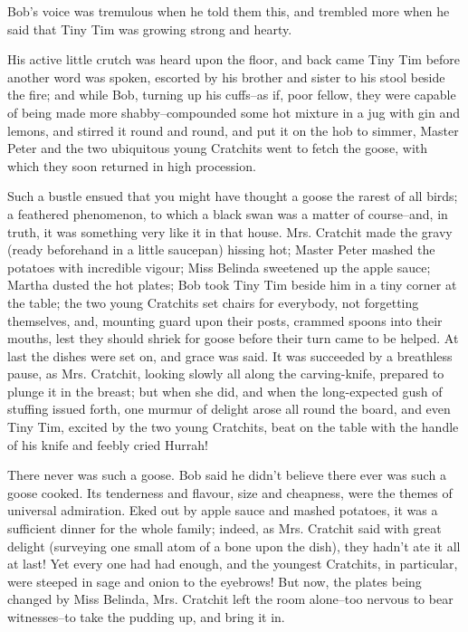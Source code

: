 Bob's voice was tremulous when he told them this, and trembled more when
he said that Tiny Tim was growing strong and hearty.

His active little crutch was heard upon the floor, and back came Tiny
Tim before another word was spoken, escorted by his brother and
sister to his stool beside the fire; and while Bob, turning up his
cuffs--as if, poor fellow, they were capable of being made more
shabby--compounded some hot mixture in a jug with gin and lemons, and
stirred it round and round, and put it on the hob to simmer, Master
Peter and the two ubiquitous young Cratchits went to fetch the goose,
with which they soon returned in high procession.

Such a bustle ensued that you might have thought a goose the rarest of
all birds; a feathered phenomenon, to which a black swan was a matter of
course--and, in truth, it was something very like it in that house. Mrs.
Cratchit made the gravy (ready beforehand in a little saucepan) hissing
hot; Master Peter mashed the potatoes with incredible vigour; Miss
Belinda sweetened up the apple sauce; Martha dusted the hot plates; Bob
took Tiny Tim beside him in a tiny corner at the table; the two young
Cratchits set chairs for everybody, not forgetting themselves, and,
mounting guard upon their posts, crammed spoons into their mouths, lest
they should shriek for goose before their turn came to be helped. At
last the dishes were set on, and grace was said. It was succeeded by a
breathless pause, as Mrs. Cratchit, looking slowly all along the
carving-knife, prepared to plunge it in the breast; but when she did,
and when the long-expected gush of stuffing issued forth, one murmur of
delight arose all round the board, and even Tiny Tim, excited by the two
young Cratchits, beat on the table with the handle of his knife and
feebly cried Hurrah!

There never was such a goose. Bob said he didn't believe there ever was
such a goose cooked. Its tenderness and flavour, size and cheapness,
were the themes of universal admiration. Eked out by apple sauce and
mashed potatoes, it was a sufficient dinner for the whole family;
indeed, as Mrs. Cratchit said with great delight (surveying one small
atom of a bone upon the dish), they hadn't ate it all at last! Yet every
one had had enough, and the youngest Cratchits, in particular, were
steeped in sage and onion to the eyebrows! But now, the plates being
changed by Miss Belinda, Mrs. Cratchit left the room alone--too nervous
to bear witnesses--to take the pudding up, and bring it in.

